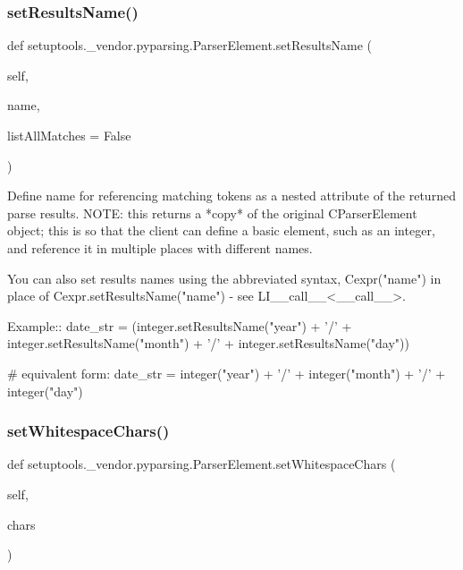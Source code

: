 \subsubsection{\texorpdfstring{set\+Results\+Name()}{setResultsName()}}
{\footnotesize\ttfamily def setuptools.\+\_\+vendor.\+pyparsing.\+Parser\+Element.\+set\+Results\+Name (\begin{DoxyParamCaption}\item[{}]{self,  }\item[{}]{name,  }\item[{}]{list\+All\+Matches = {\ttfamily False} }\end{DoxyParamCaption})}

\begin{DoxyVerb}Define name for referencing matching tokens as a nested attribute
of the returned parse results.
NOTE: this returns a *copy* of the original C{ParserElement} object;
this is so that the client can define a basic element, such as an
integer, and reference it in multiple places with different names.

You can also set results names using the abbreviated syntax,
C{expr("name")} in place of C{expr.setResultsName("name")} - 
see L{I{__call__}<__call__>}.

Example::
    date_str = (integer.setResultsName("year") + '/' 
        + integer.setResultsName("month") + '/' 
        + integer.setResultsName("day"))

    # equivalent form:
    date_str = integer("year") + '/' + integer("month") + '/' + integer("day")
\end{DoxyVerb}
 \mbox{\label{classsetuptools_1_1__vendor_1_1pyparsing_1_1_parser_element_a64f1dbcc7765fbc8899bd0ae8de22e54}} 
\subsubsection{\texorpdfstring{set\+Whitespace\+Chars()}{setWhitespaceChars()}}
{\footnotesize\ttfamily def setuptools.\+\_\+vendor.\+pyparsing.\+Parser\+Element.\+set\+Whitespace\+Chars (\begin{DoxyParamCaption}\item[{}]{self,  }\item[{}]{chars }\end{DoxyParamCaption})}

